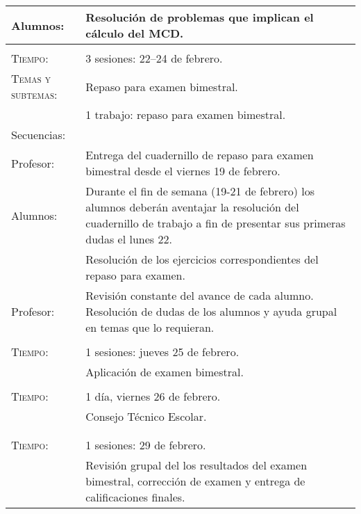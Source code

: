 \documentclass[letterpaper,10pt]{article}
\begin{document}
\begin{tabular}[t]{R{0.25\textwidth}p{0.71\textwidth}}
    Alumnos:    & Resoluci\'on de problemas que implican el c\'alculo del MCD. 
\\ \hline \\



\vfill


    \textsc{Tiempo:}           & 3 sesiones: 22--24  de febrero. \\
    \textsc{Temas y subtemas:} & Repaso para examen bimestral. \\
     & 1 trabajo: repaso para examen bimestral. \\
    \large{\sc Secuencias:} \\
    
    Profesor:   & Entrega del cuadernillo de repaso para examen bimestral desde
    el viernes 19 de febrero. \\
    
    Alumnos:    & Durante el fin de semana (19-21 de febrero) los alumnos 
    deber\'an aventajar la resoluci\'on del cuadernillo de trabajo a fin de 
    presentar sus primeras dudas el lunes 22. \\ & Resoluci\'on de los 
    ejercicios correspondientes del repaso para examen. \\
    
    Profesor:   & Revisi\'on constante del avance de cada alumno. Resoluci\'on 
    de dudas de los alumnos y ayuda grupal en temas que lo requieran. 
\\ \hline \\

    \textsc{Tiempo:}& 1 sesiones: jueves 25 de febrero. \\
            & {\Large \sc Aplicaci\'on de examen bimestral}. \\
\\ \hline

    \textsc{Tiempo:}& 1 d\'ia, viernes 26 de febrero. \\
                    & {\Large \sc Consejo T\'ecnico Escolar.} \\ 

\\ \hline \\

    \textsc{Tiempo:}& 1 sesiones: 29  de febrero. \\
            & Revisi\'on grupal del los resultados del examen bimestral,
            correcci\'on de examen y entrega de calificaciones finales.
\\ \hline


\end{tabular}
\end{document}
